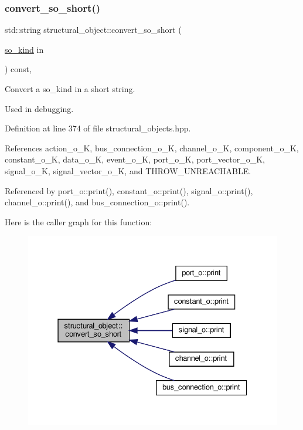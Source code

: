 \subsubsection{\texorpdfstring{convert\+\_\+so\+\_\+short()}{convert\_so\_short()}}
{\footnotesize\ttfamily std\+::string structural\+\_\+object\+::convert\+\_\+so\+\_\+short (\begin{DoxyParamCaption}\item[{\hyperlink{structural__objects_8hpp_acf52399aecacb7952e414c5746ce6439}{so\+\_\+kind}}]{in }\end{DoxyParamCaption}) const\hspace{0.3cm}{\ttfamily [inline]}, {\ttfamily [protected]}}



Convert a so\+\_\+kind in a short string. 

Used in debugging. 

Definition at line 374 of file structural\+\_\+objects.\+hpp.



References action\+\_\+o\+\_\+K, bus\+\_\+connection\+\_\+o\+\_\+K, channel\+\_\+o\+\_\+K, component\+\_\+o\+\_\+K, constant\+\_\+o\+\_\+K, data\+\_\+o\+\_\+K, event\+\_\+o\+\_\+K, port\+\_\+o\+\_\+K, port\+\_\+vector\+\_\+o\+\_\+K, signal\+\_\+o\+\_\+K, signal\+\_\+vector\+\_\+o\+\_\+K, and T\+H\+R\+O\+W\+\_\+\+U\+N\+R\+E\+A\+C\+H\+A\+B\+LE.



Referenced by port\+\_\+o\+::print(), constant\+\_\+o\+::print(), signal\+\_\+o\+::print(), channel\+\_\+o\+::print(), and bus\+\_\+connection\+\_\+o\+::print().

Here is the caller graph for this function\+:
\nopagebreak
\begin{figure}[H]
\begin{center}
\leavevmode
\includegraphics[width=331pt]{d8/da3/classstructural__object_a9cae0eae58b6f33a704cef27ed551692_icgraph}
\end{center}
\end{figure}
\mbox{\label{classstructural__object_a6566435c67934f6b4ff1b319c0682b18}} 
